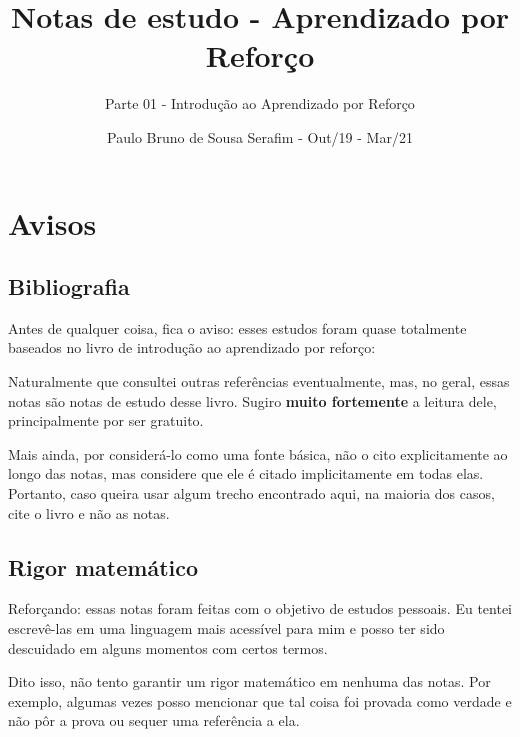 \documentclass{article}
\title{Notas de estudo - Aprendizado por Reforço}
\author{Parte 01 - Introdução ao Aprendizado por Reforço}
\date{Paulo Bruno de Sousa Serafim - Out/19 - Mar/21}
\begin{document}
\maketitle

    \section{Avisos}
    
        \subsection{Bibliografia}
        
            Antes de qualquer coisa, fica o aviso: esses estudos foram quase totalmente baseados no livro de introdução ao aprendizado por reforço:
        
            \begin{center}
            \noindent{}%
            \end{center}
            
            Naturalmente que consultei outras referências eventualmente, mas, no geral, essas notas são notas de estudo desse livro. Sugiro \textbf{muito fortemente} a leitura dele, principalmente por ser gratuito.
            
            Mais ainda, por considerá-lo como uma fonte básica, não o cito explicitamente ao longo das notas, mas considere que ele é citado implicitamente em todas elas. Portanto, caso queira usar algum trecho encontrado aqui, na maioria dos casos, cite o livro e não as notas.
            
        \subsection{Rigor matemático}
        
            Reforçando: essas notas foram feitas com o objetivo de estudos pessoais. Eu tentei escrevê-las em uma linguagem mais acessível para mim e posso ter sido descuidado em alguns momentos com certos termos.
            
            Dito isso, não tento garantir um rigor matemático em nenhuma das notas. Por exemplo, algumas vezes posso mencionar que tal coisa foi provada como verdade e não pôr a prova ou sequer uma referência a ela.
            
\end{document}
